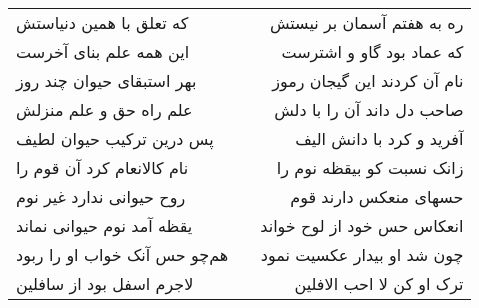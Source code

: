 \begin{center}
\begin{longtable}{l p{0.5cm} r}
که تعلق با همین دنیاستش
&&
ره به هفتم آسمان بر نیستش
\\
این همه علم بنای آخرست
&&
که عماد بود گاو و اشترست
\\
بهر استبقای حیوان چند روز
&&
نام آن کردند این گیجان رموز
\\
علم راه حق و علم منزلش
&&
صاحب دل داند آن را با دلش
\\
پس درین ترکیب حیوان لطیف
&&
آفرید و کرد با دانش الیف
\\
نام کالانعام کرد آن قوم را
&&
زانک نسبت کو بیقظه نوم را
\\
روح حیوانی ندارد غیر نوم
&&
حسهای منعکس دارند قوم
\\
یقظه آمد نوم حیوانی نماند
&&
انعکاس حس خود از لوح خواند
\\
هم‌چو حس آنک خواب او را ربود
&&
چون شد او بیدار عکسیت نمود
\\
لاجرم اسفل بود از سافلین
&&
ترک او کن لا احب الافلین
\\
\end{longtable}
\end{center}
